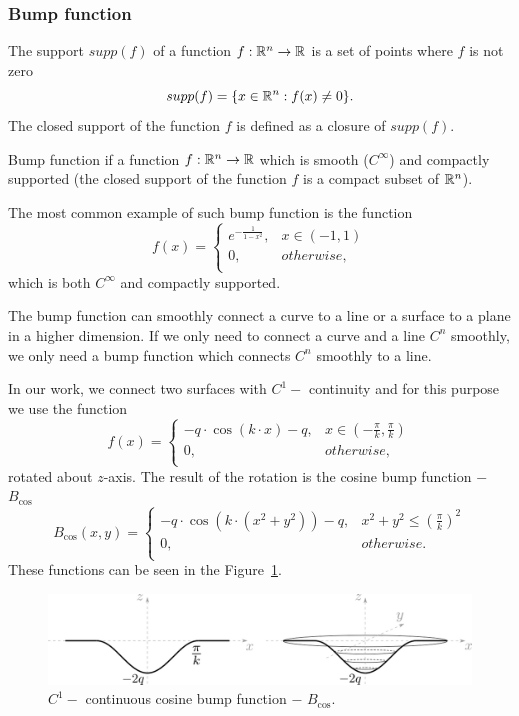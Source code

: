 \subsubsection*{Bump function}
\begin{definition}
The support $supp(f)$ of a function $f: \mathbb{R}^n \to \mathbb{R}$ is a set of points where $f$ is not
zero $$supp(f) = \{ x\in \mathbb{R}^n : f(x)\neq 0 \}.$$
The closed support of the function $f$ is defined as a closure of $supp(f)$.
\end{definition}
Bump function if a function $f:\mathbb{R}^n \to \mathbb{R}$ which is smooth ($C^\infty$) and
compactly supported (the closed support of the function $f$ is a compact subset
of $\mathbb{R}^n$).

The most common example of such bump function is the function 
$$f(x)= \left\{
    \begin{array}{ll}
        e^{-\frac{1}{1-x^2}}, & x \in (-1, 1) \\
          0, & otherwise,\\
    \end{array} 
    \right. $$
which is both $C^\infty$ and compactly supported.

The bump function can smoothly connect a curve to a line or a surface to a
plane in a higher dimension. If we only need to connect a curve and a line $C^n$ smoothly, 
we only need a bump function which connects $C^n$ smoothly to a line.

In our work, we connect two surfaces with $C^1 -$ continuity and for this purpose
we use the function
$$f(x)= \left\{
    \begin{array}{ll}
        -q \cdot \cos(k \cdot x)-q, & x \in (-\frac{\pi}{k}, \frac{\pi}{k}) \\
        0, & otherwise,\\
    \end{array} 
    \right. $$
rotated about $z$-axis.
The result of the rotation is the cosine bump function $-$ $B_{\cos}$
$$B_{\cos}(x, y) = \left\{
    \begin{array}{ll}
        -q \cdot \cos(k \cdot (x^2+y^2))-q, & x^2+y^2 \leq (\frac{\pi}{k})^2 \\
        0, & otherwise.\\
    \end{array} 
    \right. $$
These functions can be seen in the Figure~\ref{img:21}.
\begin{figure}
    \centerline{\includegraphics[scale=0.5]{images/img21}}
    \caption[$C^1-$ continuous cosine bump function $-$ $B_{\cos}$]
    {$C^1-$ continuous cosine bump function $-$ $B_{\cos}$.}
    \label{img:21}
\end{figure}
 
